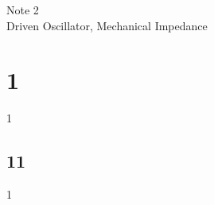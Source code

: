 \documentclass[12pt]{article}
\begin{document}
\normalfont
\pagestyle{pages}


\begin{center}
\vspace{3in}
{\Large Note 2 } \\[0.05in]
Driven Oscillator, Mechanical Impedance \\ [0.5in]
\end{center}


\section{1}
1

\subsection{11}

1
\end{document}
